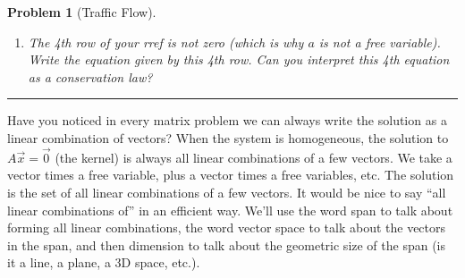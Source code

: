 \documentclass[letterpaper,oneside]{book}%
\theoremstyle{plain}
\theoremstyle{box}
\theoremstyle{problem}
\newtheorem{problemnum}{Problem}[chapter]
\newenvironment{problem}[1][]{\begin{problemnum}[#1]}{\end{problemnum}\nopagebreak\hrule\bigskip}
\newcommand{\bvec}[1]{\begin{bmatrix} #1 \end{bmatrix}}
\begin{document}
\begin{problem}[Traffic Flow]
\begin{enumerate}
\item 
The 4th row of your rref is not zero (which is why $a$ is not a free variable).  
Write the equation given by this 4th row.  Can you interpret this 4th equation as a conservation law?
\end{enumerate}
\end{problem}




Have you noticed in every matrix problem we can always write the solution as a linear combination of vectors? 
When the system is homogeneous, the solution to $A\vec x = \vec 0$ (the kernel) is always all linear combinations of a few vectors. We take a vector times a free variable, plus a vector times a free variables, etc. The solution is the set of all linear combinations of a few vectors. It would be nice to say ``all linear combinations of'' in an efficient way. We'll use the word span to talk about forming all linear combinations, the word vector space to talk about the vectors in the span, and then dimension to talk about the geometric size of the span (is it a line, a plane, a 3D space, etc.).
\end{document}
